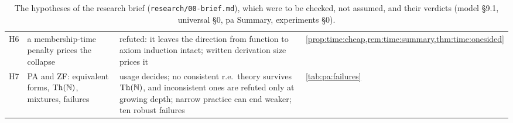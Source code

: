 \begin{table}[htbp]
\begin{tabularx}{\textwidth}{@{}l>{\raggedright\arraybackslash}p{}>{\raggedright\arraybackslash}X>{\raggedright\arraybackslash}p{}@{}}
H6 & a membership-time penalty prices the collapse & refuted: it leaves the direction from function to axiom induction intact; written derivation size prices it & \cref{prop:time:cheap,rem:time:summary,thm:time:onesided}\\
H7 & PA and ZF: equivalent forms, $\mathrm{Th}(\mathbb{N})$, mixtures, failures & usage decides; no consistent r.e.\ theory survives $\mathrm{Th}(\mathbb{N})$, and inconsistent ones are refuted only at growing depth; narrow practice can end weaker; ten robust failures & \cref{tab:pa:failures}\\
\bottomrule
\end{tabularx}
\caption{The hypotheses of the research brief (\texttt{research/00-brief.md}), which were to be checked, not assumed, and their verdicts (model \S9.1, universal \S0, pa Summary, experiments \S0).}
\label{tab:intro:verdicts}
\end{table}

